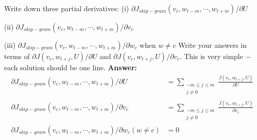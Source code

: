 \documentclass{article}
\begin{document}
\medbreak
Write down three partial derivatives:
\medbreak
(i) $\partial J_{skip-gram}(v_c, w_{t-m}, \cdots, w_{t+m})/\partial U$

(ii) $\partial J_{skip-gram}(v_c, w_{t-m}, \cdots, w_{t+m})/\partial v_c$

(iii) $\partial J_{skip-gram}(v_c, w_{t-m}, \cdots, w_{t+m})/\partial w_c$ when $w \ne c$
\medbreak
Write your answers in terms of $\partial J(v_c, w_{t+j}, U)/\partial U$ and $\partial J(v_c, w_{t+j}, U)/\partial v_c$. This is very simple $-$ each solution should be one line.
\bigbreak
\noindent
\textbf{Answer:} 
\begin{align*}
    \partial J_{skip-gram}(v_c, w_{t-m}, \cdots, w_{t+m})/\partial U &= \sum_{\substack{-m \leq j \leq m\\ j\ne 0}} \frac{J(v_c, w_{t+j}, U)}{\partial U}\\
    \partial J_{skip-gram}(v_c, w_{t-m}, \cdots, w_{t+m})/\partial v_c &= \sum_{\substack{-m \leq j \leq m\\ j\ne 0}} \frac{J(v_c, w_{t+j}, U)}{\partial v_c}\\
    \partial J_{skip-gram}(v_c, w_{t-m}, \cdots, w_{t+m})/\partial w_c (w \ne c) &= 0
\end{align*}

\bigbreak
\end{document}
